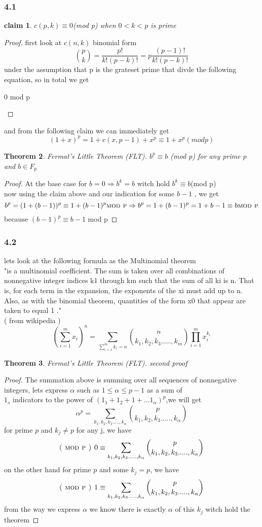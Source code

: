 \documentclass[12pt]{article}
\newtheorem{theorem}{Theorem}[section]
\newtheorem{claim}[theorem]{claim}
\begin{document}
\subsubsection*{4.1}
\begin{claim}
$c(p,k)\equiv0$(mod p) when $0<k<p$ is prime 
\end{claim}
\begin{proof}
first look at $c(n,k)$ binomial form
\[\binom{p}{k}=\dfrac{p!}{k!(p-k)!}=p\dfrac{(p-1)!}{k!(p-k)!}
\]
under the assumption that p is the grateset prime that divde the  following equation, so in total we get
\begin{center}
0 mod p
\end{center}
\end{proof}
and from the following claim we can immediately get  
\[
(1+x)^p=1+c(x,p-1)+x^p \equiv 1 + x^p (mod p)\]
\begin{theorem}
Fermat’s Little Theorem (FLT). $b^
p \equiv b$ (mod p) for any prime $p$ and $b \in F_p$
\end{theorem}
\begin{proof}
At the base case for $b=0\Rightarrow b^k=b$ witch hold $b^k \equiv b$(mod p)
\\ now using the claim above and our indication for some $b-1$ , we get
\[b^p=(1+(b-1))^p\equiv 1+(b-1)^p \textsc{mod p}\Rightarrow b^p=1+(b-1)^p=1+b-1
 \equiv b \textsc{mod p} \]
 because $(b-1)^p\equiv b-1$ mod p
\end{proof}
\subsubsection*{4.2}

lets look at the following formula as the Multinomial theorem \\"is a multinomial coefficient. The sum is taken over all combinations of nonnegative integer indices k1 through km such that the sum of all ki is n. That is, for each term in the expansion, the exponents of the xi must add up to n. Also, as with the binomial theorem, quantities of the form x0 that appear are taken to equal 1 ."\\( from wikipedia )
\[
\displaystyle \left(\sum_{i=1}^{m}x_i\right)^n=\sum_{\sum_{i=1}^m k_i=n}^{}\binom{n}{k_1,k_2,k_3.....,k_m}\prod_{i=1}^{m}x_i^{k_i}
\]
\begin{theorem}
Fermat’s Little Theorem (FLT). second proof
\end{theorem}
\begin{proof}
The summation above is summing over all sequences of nonnegative integers, lets express $\alpha$ such as $1 \leq \alpha \leq  p-1$ as a sum of\\ $1_s$ indicators to the power of $(1_1 + 1_2 + 1+ … 1_\alpha)^p$,we will get
\[
\alpha^p=\sum_{k_1,k_2,k_3.....,k_\alpha}^{}\binom{p}{k_1,k_2,k_3.....,k_\alpha}
\]
for prime $p$ and $k_j \neq p$ for any j, we have
\[ \textsc{( mod p ) 0}
\equiv \sum_{k_1,k_2,k_3.....,k_\alpha}^{}\binom{p}{k_1,k_2,k_3.....,k_\alpha}
\]
on the other hand for prime $p$ and some $k_j = p$, we have
\[ \textsc{( mod p ) 1}
\equiv \sum_{k_1,k_2,k_3.....,k_\alpha}^{}\binom{p}{k_1,k_2,k_3.....,k_\alpha}
\]
from the way we express $\alpha$ we know there is  exactly $\alpha$ of this $k_j$ witch hold the theorem
\end{proof}
\end{document}
